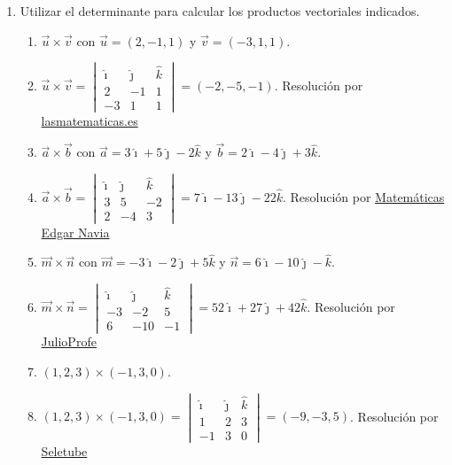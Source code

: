 \documentclass[a4paper]{article}
\newcommand{\answer}{\item[**]}
\newcommand{\exercise}{\item}
\begin{document}
\begin{enumerate}
\begin{multicols}{3}
\begin{enumerate} [label=(\alph*)]
	\end{enumerate}
	\end{multicols}

	\exercise Utilizar el determinante para calcular los productos vectoriales indicados.
	\begin{enumerate} [label=(\alph*)]
		
		\item $\vec{u} \times \vec{v}$ con $\vec{u}=(2,-1,1)$ y $\vec{v}=(-3,1,1)$.
		\answer $\vec{u} \times \vec{v}=\begin{vmatrix} \hat{\imath} & \hat{\jmath} & \hat{k} \\ 2 & -1 & 1 \\ -3 & 1 & 1\end{vmatrix}=(-2,-5,-1)$. Resolución por \href{https://youtu.be/P0aD2zSXuC8}{lasmatematicas.es}

		\item $\vec{a} \times \vec{b}$ con $\vec{a}=3\hat{\imath}+5\hat{\jmath}-2\hat{k}$ y $\vec{b}=2\hat{\imath}-4\hat{\jmath}+3\hat{k}$.
		\answer $\vec{a} \times \vec{b}=\begin{vmatrix} \hat{\imath} & \hat{\jmath} & \hat{k} \\ 3 & 5 & -2 \\ 2 & -4 & 3\end{vmatrix}=7\hat{\imath}-13\hat{\jmath}-22\hat{k}$. Resolución por \href{https://youtu.be/-JODKVdQ9H4}{Matemáticas Edgar Navia}

		\item $\vec{m} \times \vec{n}$ con $\vec{m}=-3\hat{\imath}-2\hat{\jmath}+5\hat{k}$ y $\vec{n}=6\hat{\imath}-10\hat{\jmath}-\hat{k}$.
		\answer $\vec{m} \times \vec{n}=\begin{vmatrix} \hat{\imath} & \hat{\jmath} & \hat{k} \\ -3 & -2 & 5 \\ 6 & -10 & -1\end{vmatrix}=52\hat{\imath}+27\hat{\jmath}+42\hat{k}$. Resolución por \href{https://youtu.be/fmAhi1N-uL8}{JulioProfe}

		\item $(1,2,3) \times (-1,3,0)$.
		\answer $(1,2,3) \times (-1,3,0)=\begin{vmatrix} \hat{\imath} & \hat{\jmath} & \hat{k} \\ 1 & 2 & 3 \\ -1 & 3 & 0\end{vmatrix}=(-9,-3,5)$. Resolución por \href{https://youtu.be/_5MyVA6znPQ}{Seletube}


\end{enumerate}
\end{enumerate}
\end{document}
